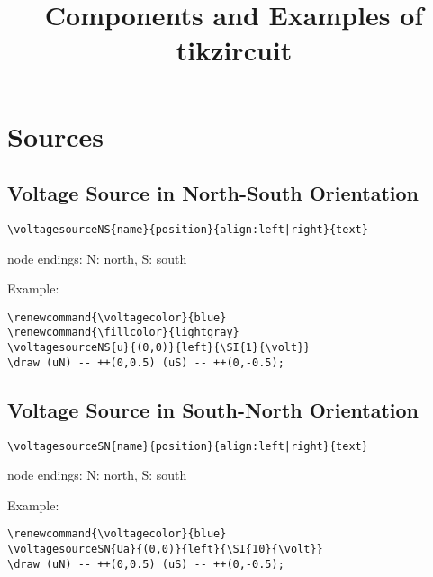 \documentclass[parskip=full]{scrartcl}
\title{Components and Examples of tikzircuit}
\begin{document}
\maketitle
\tableofcontents
\newpage


\section{Sources}

\subsection{Voltage Source in North-South Orientation}

\begin{verbatim}
\voltagesourceNS{name}{position}{align:left|right}{text}
\end{verbatim}
node endings: N: north, S: south

Example:\\
\begin{minipage}{0.8\textwidth}
\begin{verbatim}
\renewcommand{\voltagecolor}{blue}
\renewcommand{\fillcolor}{lightgray}
\voltagesourceNS{u}{(0,0)}{left}{\SI{1}{\volt}}
\draw (uN) -- ++(0,0.5) (uS) -- ++(0,-0.5);
\end{verbatim}
\end{minipage}
\begin{minipage}{0.19\textwidth}
\end{minipage}

\subsection{Voltage Source in South-North Orientation}

\begin{verbatim}
\voltagesourceSN{name}{position}{align:left|right}{text}
\end{verbatim}
node endings: N: north, S: south

Example:\\
\begin{minipage}{0.8\textwidth}
\begin{verbatim}
\renewcommand{\voltagecolor}{blue}
\voltagesourceSN{Ua}{(0,0)}{left}{\SI{10}{\volt}}
\draw (uN) -- ++(0,0.5) (uS) -- ++(0,-0.5);
\end{verbatim}
\end{minipage}
\begin{minipage}{0.19\textwidth}
\end{minipage}
\end{document}
